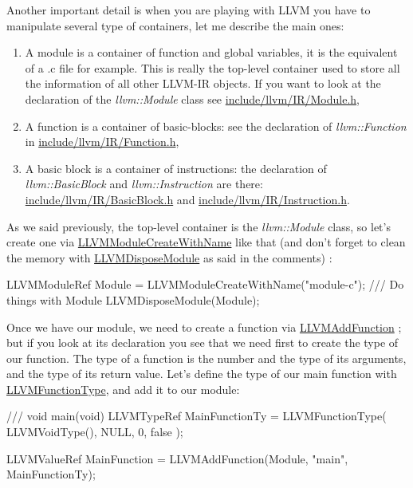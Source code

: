 \documentclass[a4paper, 11pt, notitlepage]{report}
\begin{document}
Another important detail is when you are playing with LLVM you have to manipulate several type of containers, let me describe the main ones:
\begin{enumerate}
	\item A module is a container of function and global variables, it is the equivalent of a .c file for example. This is really the top-level container used to store all the information of all other LLVM-IR objects. If you want to look at the declaration of the \textit{llvm::Module} class see \href{https://llvm.org/viewvc/llvm-project/llvm/trunk/include/llvm/IR/Module.h?view=markup}{include/llvm/IR/Module.h},
	\item A function is a container of basic-blocks: see the declaration of \textit{llvm::Function} in \href{https://llvm.org/viewvc/llvm-project/llvm/trunk/include/llvm/IR/Function.h?view=markup}{include/llvm/IR/Function.h},
	\item A basic block is a container of instructions: the declaration of \textit{llvm::BasicBlock} and \textit{llvm::Instruction} are there: \href{https://llvm.org/viewvc/llvm-project/llvm/trunk/include/llvm/IR/BasicBlock.h?view=markup}{include/llvm/IR/BasicBlock.h} and \href{https://llvm.org/viewvc/llvm-project/llvm/trunk/include/llvm/IR/Instruction.h?view=markup}{include/llvm/IR/Instruction.h}.
\end{enumerate}

As we said previously, the top-level container is the \textit{llvm::Module} class, so let's create one via \href{https://llvm.org/viewvc/llvm-project/llvm/trunk/include/llvm-c/Core.h?view=markup}{LLVMModuleCreateWithName} like that (and don't forget to clean the memory with \href{https://llvm.org/viewvc/llvm-project/llvm/trunk/include/llvm-c/Core.h?view=markup}{LLVMDisposeModule} as said in the comments) :
\begin{ccode}
LLVMModuleRef Module = LLVMModuleCreateWithName("module-c");
/// Do things with Module
LLVMDisposeModule(Module);
\end{ccode}

Once we have our module, we need to create a function via \href{https://llvm.org/viewvc/llvm-project/llvm/trunk/include/llvm-c/Core.h?view=markup}{LLVMAddFunction} ; but if you look at its declaration you see that we need first to create the type of our function. The type of a function is the number and the type of its arguments, and the type of its return value. Let's define the type of our main function with \href{https://llvm.org/viewvc/llvm-project/llvm/trunk/include/llvm-c/Core.h?view=markup}{LLVMFunctionType}, and add it to our module:
\begin{ccode}
/// void main(void)
LLVMTypeRef MainFunctionTy = LLVMFunctionType(
    LLVMVoidType(),
    NULL,
    0,
    false
);

LLVMValueRef MainFunction = LLVMAddFunction(Module, "main", MainFunctionTy);
\end{ccode}
\end{document}
